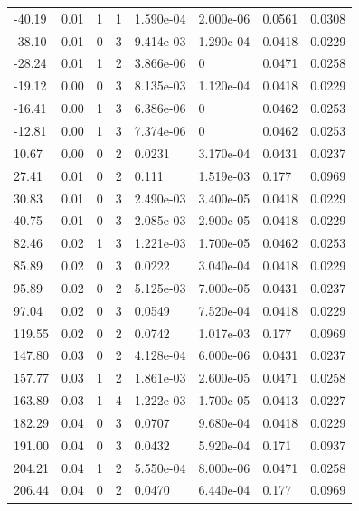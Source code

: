\documentclass[preview]{standalone}
\begin{document}
{{\begin{tabular}{L{1.2cm}C{1.2cm} C{0.3cm}C{0.5cm} C{1.4cm}C{1.4cm} C{1.4cm}C{1.4cm}}
  -40.19  &  0.01  & 1     &  1 &  1.590e-04  & 2.000e-06  & 0.0561 &  0.0308   \\ 
  -38.10  &  0.01  & 0     &  3 &  9.414e-03  & 1.290e-04  & 0.0418 &  0.0229   \\ 
  -28.24  &  0.01  & 1     &  2 &  3.866e-06  & 0  & 0.0471 &  0.0258   \\ 
  -19.12  &  0.00  & 0     &  3 &  8.135e-03  & 1.120e-04  & 0.0418 &  0.0229   \\ 
  -16.41  &  0.00  & 1     &  3 &  6.386e-06  & 0  & 0.0462 &  0.0253   \\ 
  -12.81  &  0.00  & 1     &  3 &  7.374e-06  & 0  & 0.0462 &  0.0253   \\ 
  10.67  &  0.00  & 0     &  2 &  0.0231  & 3.170e-04  & 0.0431 &  0.0237   \\ 
  27.41  &  0.01  & 0     &  2 &  0.111  & 1.519e-03  & 0.177 &  0.0969   \\ 
  30.83  &  0.01  & 0     &  3 &  2.490e-03  & 3.400e-05  & 0.0418 &  0.0229   \\ 
  40.75  &  0.01  & 0     &  3 &  2.085e-03  & 2.900e-05  & 0.0418 &  0.0229   \\ 
  82.46  &  0.02  & 1     &  3 &  1.221e-03  & 1.700e-05  & 0.0462 &  0.0253   \\ 
  85.89  &  0.02  & 0     &  3 &  0.0222  & 3.040e-04  & 0.0418 &  0.0229   \\ 
  95.89  &  0.02  & 0     &  2 &  5.125e-03  & 7.000e-05  & 0.0431 &  0.0237   \\ 
  97.04  &  0.02  & 0     &  3 &  0.0549  & 7.520e-04  & 0.0418 &  0.0229   \\ 
  119.55  &  0.02  & 0     &  2 &  0.0742  & 1.017e-03  & 0.177 &  0.0969   \\ 
  147.80  &  0.03  & 0     &  2 &  4.128e-04  & 6.000e-06  & 0.0431 &  0.0237   \\ 
  157.77  &  0.03  & 1     &  2 &  1.861e-03  & 2.600e-05  & 0.0471 &  0.0258   \\ 
  163.89  &  0.03  & 1     &  4 &  1.222e-03  & 1.700e-05  & 0.0413 &  0.0227   \\ 
  182.29  &  0.04  & 0     &  3 &  0.0707  & 9.680e-04  & 0.0418 &  0.0229   \\ 
  191.00  &  0.04  & 0     &  3 &  0.0432  & 5.920e-04  & 0.171 &  0.0937   \\ 
  204.21  &  0.04  & 1     &  2 &  5.550e-04  & 8.000e-06  & 0.0471 &  0.0258   \\ 
  206.44  &  0.04  & 0     &  2 &  0.0470  & 6.440e-04  & 0.177 &  0.0969   \\ 

\end{tabular}}}
\end{document}
